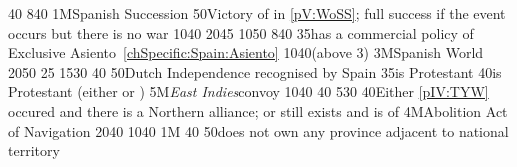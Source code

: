 {}{40}{\EU@objPortugalAnnexed}%
%
%
{8}{40}{\EU@objMonopolyZone}%
%
%
\EUobjective1M{Spanish Succession}{}%
{}{50}{Victory of \paysmajeurEspagne in \ref{pV:WoSS}; full success if the
  event occurs but there is no war}%
%
%
{10}{40}{\EU@objOuterProvinces}%
%
%
{20}{45}{\EU@objSpanishWorld}%
%
%
{10}{50}{\EU@objPresidiosHIS}%
%
%
{8}{40}{\EU@objMonopolyZone}%
%
%
%
{}{35}{\paysmajeurEspagne has a commercial policy of Exclusive
  Asiento~\ref{chSpecific:Spain:Asiento}}%
%
%
{10}{40}{\EU@objOuterProvinces (above 3)}%
%
\EUobjective3M{Spanish World}{}%
{20}{50}{\EU@objSpanishWorld}%
%
%
{}{25}{\EU@objIndustrial}%
%
%
{15}{30}{\EU@objIndependanceWars}%
%
 
%
%
{}{40}{}%
%
%
{}{50}{Dutch Independence recognised by Spain}%
%
%
{}{35}{\paysmajeurFrance is Protestant}%
%
%
{}{40}{\paysmajeurAngleterre is Protestant (either \PROTANG or \PROTPUR)}%
%
\EUobjective5M{\emph{East Indies}}{convoy}%
{10}{40}{\EU@objEastIndiesConvoy}%
%
%
%
{}{40}{}%
%
%
{5}{30}{\EU@objBaltiqueTrade}%
%
%
{}{40}{Either \ref{pIV:TYW} occured and there is a Northern \HRE alliance; or
  \payshanse still exists and is \VASSAL of \paysmajeurHollande}%
%
\EUobjective4M{Abolition Act of Navigation}{}%
{20}{40}{\EU@objNoActNavigation}%
%
%
{10}{40}{\EU@objEachCOL[\continentBrazil]}%
%
%
\EUobjective1M{}{}%
{}{40}{}%
%
%
{}{50}{\paysmajeurFrance does not own any province adjacent to
  \paysmajeurHollande national territory}%
%
%
